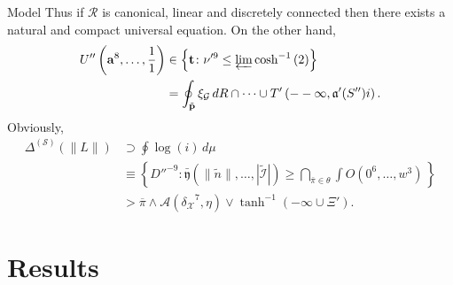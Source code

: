 \documentclass[xcolor=table]{beamer}
\begin{document}
\begin{frame}{Model}
	 Thus if $\mathscr{{R}}$ is canonical, linear and discretely connected then there exists a natural and compact universal equation. On the other hand, \begin{align*} U'' \left( \mathbf{{a}}^{8}, \dots, \frac{1}{1} \right) & \in \left\{ \mathbf{{t}} \colon \nu'^{9} \le \varprojlim \cosh^{-1} \left( 2 \right) \right\} \\ & = \oint_{\tilde{\mathbf{{p}}}} {\xi_{\mathcal{{G}}}} \,d R \cap \dots \cup T' \left(--\infty, \mathfrak{{a}}' ( S'' ) i \right)  .\end{align*} Obviously, \begin{align*} {\Delta^{(\mathscr{{S}})}} \left( \| L \| \right) & \supset \oint \log \left( i \right) \,d \mu \\ & \equiv \left\{ D''^{-9} \colon \bar{\mathfrak{{y}}} \left( \| \tilde{n} \|, \dots, | \tilde{\mathcal{{I}}} | \right) \ge \bigcap_{\bar{\pi} \in \theta}  \int \hat{O} \left( 0^{6}, \dots, w^{3} \right) \, \right\} \\ & > \overline{\pi} \wedge \mathscr{{A}} \left( {\delta_{\mathcal{{X}}}}^{7}, \eta \right) \vee \tanh^{-1} \left(-\infty \cup \Xi' \right) .\end{align*} 
\end{frame}
\section{Results}
\end{document}
